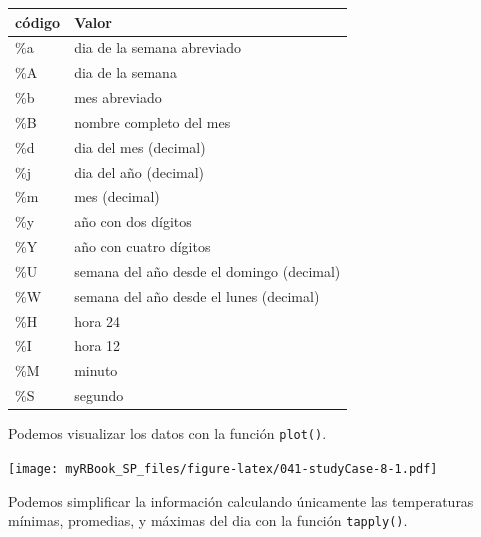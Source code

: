 \documentclass[
]{book}
\newenvironment{Shaded}{\begin{snugshade}}{\end{snugshade}}
\newcommand{\DataTypeTok}[1]{\textcolor[rgb]{0.13,0.29,0.53}{#1}}
\newcommand{\DecValTok}[1]{\textcolor[rgb]{0.00,0.00,0.81}{#1}}
\newcommand{\KeywordTok}[1]{\textcolor[rgb]{0.13,0.29,0.53}{\textbf{#1}}}
\newcommand{\NormalTok}[1]{#1}
\newcommand{\OperatorTok}[1]{\textcolor[rgb]{0.81,0.36,0.00}{\textbf{#1}}}
\newcommand{\StringTok}[1]{\textcolor[rgb]{0.31,0.60,0.02}{#1}}
\begin{document}
\begin{longtable}[]{@{}ll@{}}
\toprule
código & Valor\tabularnewline
\midrule
\endhead
\%a & dia de la semana abreviado\tabularnewline
\%A & dia de la semana\tabularnewline
\%b & mes abreviado\tabularnewline
\%B & nombre completo del mes\tabularnewline
\%d & dia del mes (decimal)\tabularnewline
\%j & dia del año (decimal)\tabularnewline
\%m & mes (decimal)\tabularnewline
\%y & año con dos dígitos\tabularnewline
\%Y & año con cuatro dígitos\tabularnewline
\%U & semana del año desde el domingo (decimal)\tabularnewline
\%W & semana del año desde el lunes (decimal)\tabularnewline
\%H & hora 24\tabularnewline
\%I & hora 12\tabularnewline
\%M & minuto\tabularnewline
\%S & segundo\tabularnewline
\bottomrule
\end{longtable}

Podemos visualizar los datos con la función \texttt{plot()}.

\begin{Shaded}
\end{Shaded}

\texttt{[image: myRBook\_SP\_files/figure-latex/041-studyCase-8-1.pdf]}

Podemos simplificar la información calculando únicamente las temperaturas mínimas, promedias, y máximas del dia con la función \texttt{tapply()}.
\end{document}
